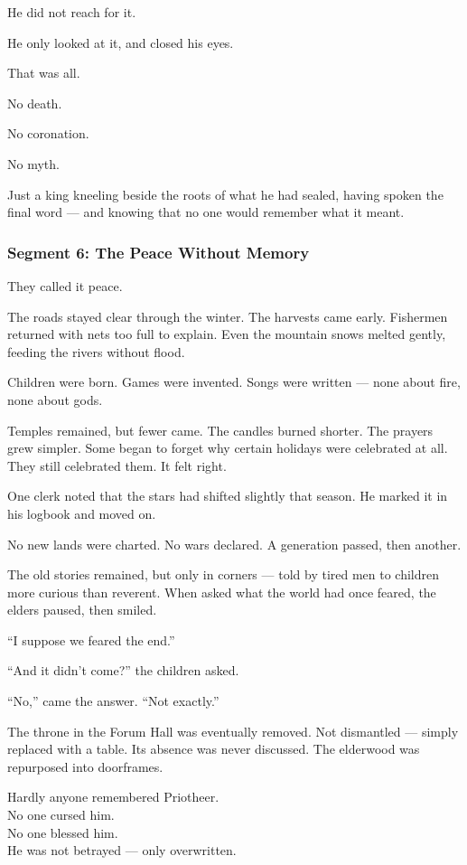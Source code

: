 \documentclass[9pt]{article}
\begin{document}
He did not reach for it.

He only looked at it, and closed his eyes.

That was all.

No death.

No coronation.

No myth.

Just a king kneeling beside the roots of what he had sealed, having spoken the final word — and knowing that no one would remember what it meant.


\newpage

\subsubsection*{Segment 6: The Peace Without Memory}

They called it peace.

The roads stayed clear through the winter. The harvests came early. Fishermen returned with nets too full to explain. Even the mountain snows melted gently, feeding the rivers without flood.

Children were born. Games were invented. Songs were written — none about fire, none about gods.

Temples remained, but fewer came. The candles burned shorter. The prayers grew simpler. Some began to forget why certain holidays were celebrated at all. They still celebrated them. It felt right.

One clerk noted that the stars had shifted slightly that season. He marked it in his logbook and moved on.

No new lands were charted. No wars declared. A generation passed, then another.

The old stories remained, but only in corners — told by tired men to children more curious than reverent. When asked what the world had once feared, the elders paused, then smiled.

``I suppose we feared the end.''

``And it didn’t come?'' the children asked.

``No,'' came the answer. ``Not exactly.''

The throne in the Forum Hall was eventually removed. Not dismantled — simply replaced with a table. Its absence was never discussed. The elderwood was repurposed into doorframes.

Hardly anyone remembered Priotheer.\\
No one cursed him.\\
No one blessed him.\\
He was not betrayed — only overwritten.
\end{document}
